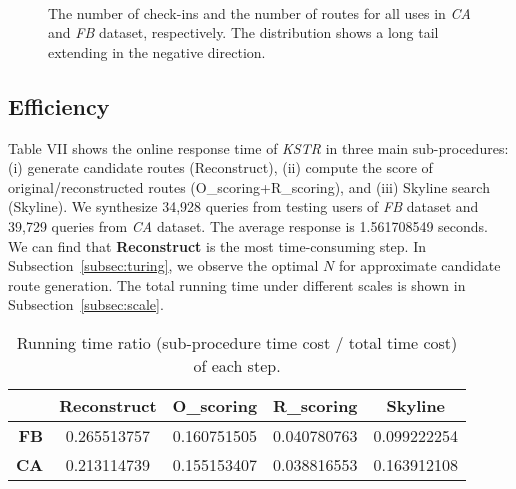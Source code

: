 \begin{figure}[h]
\centering
\mbox{
}
\mbox{
}
\caption{The number of check-ins and the number of routes for all uses in \textit{CA} and \textit{FB} dataset, respectively. The distribution shows a long tail extending in the negative direction.}
\label{fig:exp_obs}
\end{figure}



\subsection{Efficiency} \label{sec:exp_run_time}
Table VII shows the online response time of \textit{KSTR} in three main sub-procedures: (i) generate candidate routes (Reconstruct), (ii) compute the score of original/reconstructed routes (O\_scoring+R\_scoring), and (iii) Skyline search (Skyline). We synthesize 34,928 queries from testing users of \textit{FB} dataset and 39,729 queries from \textit{CA} dataset. The average response is 1.561708549 seconds. We can find that \textbf{Reconstruct} is the most time-consuming step. In Subsection~\ref{subsec:turing}, we observe the optimal $N$ for approximate candidate route generation. The total running time under different scales is shown in Subsection~\ref{subsec:scale}.

\begin{table}[h]\label{fig:exp_time}
\centering
\caption{Running time ratio (sub-procedure time cost / total time cost) of each step.}
\begin{footnotesize}
\begin{tabular}{|r|c|c|c|c|} \hline
 & \textbf{Reconstruct} & \textbf{O\_scoring} & \textbf{R\_scoring} & \textbf{Skyline} \\ \hline
\textbf{FB} & 0.265513757 & 0.160751505 & 0.040780763 & 0.099222254 \\ \hline
\textbf{CA} & 0.213114739 & 0.155153407 & 0.038816553 & 0.163912108 \\ \hline
\end{tabular}
\end{footnotesize}
\end{table}

